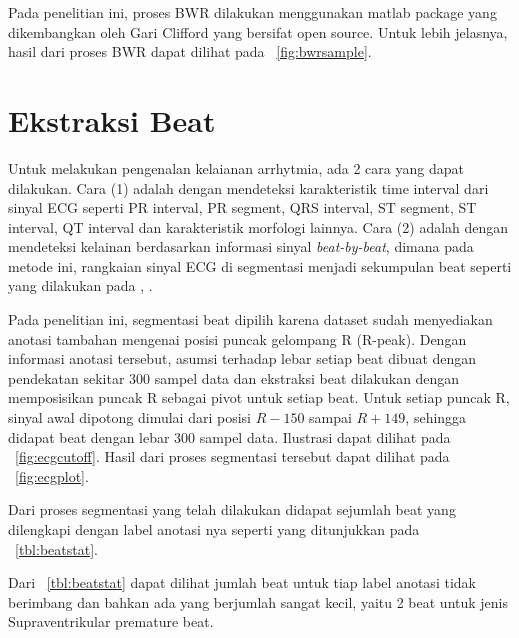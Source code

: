 Pada penelitian ini, proses BWR dilakukan menggunakan matlab package yang
dikembangkan oleh Gari Clifford \cite{clifford-2005} yang bersifat open source.
Untuk lebih jelasnya, hasil dari proses BWR dapat dilihat pada
\pic~\ref{fig:bwrsample}.

\section{Ekstraksi Beat}
\label{sec:ekstractbeat}
Untuk melakukan pengenalan kelaianan arrhytmia, ada 2 cara yang dapat dilakukan.
Cara (1) adalah dengan mendeteksi karakteristik time interval dari sinyal ECG
seperti PR interval, PR segment, QRS interval, ST segment, ST interval, QT
interval dan karakteristik morfologi lainnya. Cara (2) adalah dengan mendeteksi
kelainan berdasarkan informasi sinyal \emph{beat-by-beat}, dimana pada metode
ini, rangkaian sinyal ECG di segmentasi menjadi sekumpulan beat seperti yang
dilakukan pada \cite{Ghongade.1}, \cite{zhao-2005}.


Pada penelitian ini, segmentasi beat dipilih karena dataset sudah menyediakan 
anotasi tambahan mengenai posisi puncak gelompang R (R-peak). Dengan informasi
anotasi tersebut, asumsi terhadap lebar setiap beat dibuat dengan pendekatan
sekitar 300 sampel data dan ekstraksi beat dilakukan dengan memposisikan puncak
R sebagai pivot untuk setiap beat. Untuk setiap puncak R, sinyal awal dipotong
dimulai dari posisi $R-150$ sampai $R+149$, sehingga didapat beat dengan lebar
300 sampel data. Ilustrasi dapat dilihat pada \pic~\ref{fig:ecgcutoff}. Hasil 
dari proses segmentasi tersebut dapat dilihat pada \pic~\ref{fig:ecgplot}.


Dari proses segmentasi yang telah dilakukan didapat sejumlah beat yang
dilengkapi dengan label anotasi nya seperti yang ditunjukkan pada
\tab~\ref{tbl:beatstat}.

Dari \tab~\ref{tbl:beatstat} dapat dilihat jumlah beat untuk tiap label anotasi
tidak berimbang dan bahkan ada yang berjumlah sangat kecil, yaitu 2 beat untuk
jenis Supraventrikular premature beat. 

